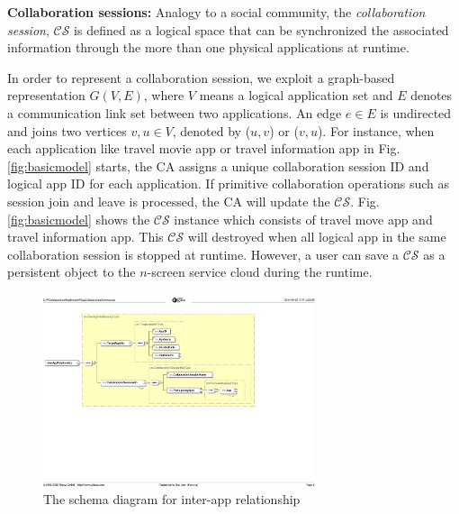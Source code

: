 \documentclass{sig-alternate}
\begin{document}
\noindent
\textbf{Collaboration sessions: }
Analogy to a social community, the \textit{collaboration session}, $\mathcal{CS}$ is defined as a logical space  that can be synchronized the associated information through the more than one physical applications at runtime.

In order to represent a collaboration session, we exploit a graph-based representation $G(V, E)$, where $V$ means a logical application set and $E$ denotes a communication link set between two applications. An edge $e \in E$ is undirected and joins two vertices $v, u \in V$, denoted by ($u, v$) or ($v, u$). 
For instance, 
when each application like travel movie app or travel information app in Fig. \ref{fig:basicmodel} starts, the CA assigns a unique collaboration session ID and logical app ID for each application. If primitive collaboration operations such as session join and leave is processed, the CA will update the $\mathcal{CS}$. Fig. \ref{fig:basicmodel} shows the  $\mathcal{CS}$ instance which consists of travel move app and travel information app. This $\mathcal{CS}$ will destroyed when all logical app in the same collaboration session is stopped at runtime. However, a user can save a $\mathcal{CS}$ as a persistent object to the $n$-screen service cloud during the runtime.
\begin{figure}[htb] %
\centering
\includegraphics[width=8cm,keepaspectratio]{interapprelation}
\caption{The schema diagram for inter-app relationship}
\label{fig:interapprelation}
\end{figure}
\end{document}
